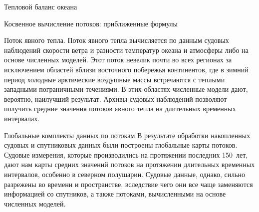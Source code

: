 \begin{chapter}{Тепловой баланс океана}
\begin{section}{Косвенное вычисление потоков: приближенные формулы}
\begin{paragraph}{Поток явного тепла.}
Поток явного тепла вычисляется по данным судовых наблюдений скорости ветра
и разности температур океана и атмосферы либо на основе численных
моделей. Этот поток невелик почти во всех регионах за исключением областей
вблизи восточного побережья континентов, где в зимний период холодные 
арктические воздушные массы встречаются с теплыми западными пограничными
течениями. В этих областях численные модели дают, вероятно, наилучший 
результат. Архивы судовых наблюдений позволяют получить средние значения 
потоков явного тепла на длительных временных интервалах.
%
\end{paragraph}
\end{section}


\begin{section}{Глобальные комплекты данных по потокам}\label{sec:FluxDataSets}
В результате обработки накопленных судовых и спутниковых данных были построены
глобальные карты потоков. Судовые измерения, которые производились на 
протяжении последних 150~лет, дают нам карты средних значений потоков 
на протяжении длительных временных интервалов, особенно в северном полушарии.
Судовые данные, однако, сильно разрежены во времени и пространстве, вследствие
чего они все чаще заменяются информацией со спутников, а также потоками, 
вычисленными на основе численных моделей.
%


\end{section}
\end{chapter}
